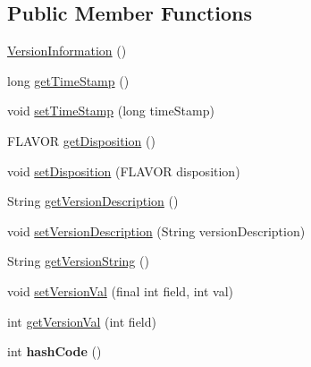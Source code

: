 \subsection*{Public Member Functions}
\begin{DoxyCompactItemize}
\item 
\hyperlink{classgov_1_1fnal_1_1ppd_1_1dd_1_1util_1_1version_1_1VersionInformation_af4471912cacd2bbb1ff3eecc148b824e}{Version\-Information} ()
\item 
long \hyperlink{classgov_1_1fnal_1_1ppd_1_1dd_1_1util_1_1version_1_1VersionInformation_ae9f86a54a3298654a55c8c1e771bce6a}{get\-Time\-Stamp} ()
\item 
void \hyperlink{classgov_1_1fnal_1_1ppd_1_1dd_1_1util_1_1version_1_1VersionInformation_a5564d38346f3a936840c82318e1cdc2e}{set\-Time\-Stamp} (long time\-Stamp)
\item 
F\-L\-A\-V\-O\-R \hyperlink{classgov_1_1fnal_1_1ppd_1_1dd_1_1util_1_1version_1_1VersionInformation_aec69aa2f69f6df902fb9da5e45b9a146}{get\-Disposition} ()
\item 
void \hyperlink{classgov_1_1fnal_1_1ppd_1_1dd_1_1util_1_1version_1_1VersionInformation_a1e3cec92f0dbdd71120e000e6787750e}{set\-Disposition} (F\-L\-A\-V\-O\-R disposition)
\item 
String \hyperlink{classgov_1_1fnal_1_1ppd_1_1dd_1_1util_1_1version_1_1VersionInformation_ac549f15230289e67d0aa6346265bd0f3}{get\-Version\-Description} ()
\item 
void \hyperlink{classgov_1_1fnal_1_1ppd_1_1dd_1_1util_1_1version_1_1VersionInformation_aa2815f5f73561ad56a803674fa70c87b}{set\-Version\-Description} (String version\-Description)
\item 
String \hyperlink{classgov_1_1fnal_1_1ppd_1_1dd_1_1util_1_1version_1_1VersionInformation_a2f986225367b6c4b22085cd2e193af86}{get\-Version\-String} ()
\item 
void \hyperlink{classgov_1_1fnal_1_1ppd_1_1dd_1_1util_1_1version_1_1VersionInformation_a6481bf957491a248df4420de2e0dbf94}{set\-Version\-Val} (final int field, int val)
\item 
int \hyperlink{classgov_1_1fnal_1_1ppd_1_1dd_1_1util_1_1version_1_1VersionInformation_adfcdb07f96bb338c4362c059a4876f0e}{get\-Version\-Val} (int field)
\item 
\hypertarget{classgov_1_1fnal_1_1ppd_1_1dd_1_1util_1_1version_1_1VersionInformation_a8c0fa24131825cf91b4af5a31054668b}{int {\bfseries hash\-Code} ()}\label{classgov_1_1fnal_1_1ppd_1_1dd_1_1util_1_1version_1_1VersionInformation_a8c0fa24131825cf91b4af5a31054668b}


\end{DoxyCompactItemize}
